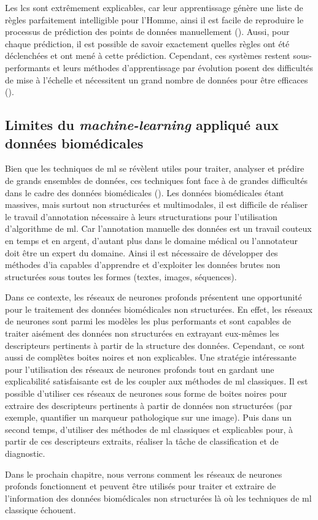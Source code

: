Les \gls{lcs} sont extrêmement explicables, car leur apprentissage génère une liste de règles parfaitement intelligible pour l'Homme, ainsi il est facile de reproduire le processus de prédiction des points de données manuellement (\cite{arrieta_explainable_2019}). Aussi, pour chaque prédiction, il est possible de savoir exactement quelles règles ont été déclenchées et ont mené à cette prédiction. Cependant, ces systèmes restent sous-performants et leurs méthodes d'apprentissage par évolution posent des difficultés de mise à l'échelle et nécessitent un grand nombre de données pour être efficaces (\cite{urbanowicz_exstracs_2015}).

\subsection{Limites du \textit{machine-learning} appliqué aux données biomédicales}
Bien que les techniques de \gls{ml} se révèlent utiles pour traiter, analyser et prédire de grands ensembles de données, ces techniques font face à de grandes difficultés dans le cadre des données biomédicales (\cite{martinez-garcia_data_2022}). Les données biomédicales étant massives, mais surtout non structurées et multimodales, il est difficile de réaliser le travail d'annotation nécessaire à leurs structurations pour l'utilisation d'algorithme de \gls{ml}. Car l'annotation manuelle des données est un travail couteux en temps et en argent, d'autant plus dans le domaine médical ou l'annotateur doit être un expert du domaine. Ainsi il est nécessaire de développer des méthodes d'\gls{ia} capables d'apprendre et d'exploiter les données brutes non structurées sous toutes les formes (textes, images, séquences).

Dans ce contexte, les réseaux de neurones profonds présentent une opportunité pour le traitement des données biomédicales non structurées. En effet, les réseaux de neurones sont parmi les modèles les plus performants et sont capables de traiter aisément des données non structurées en extrayant eux-mêmes les descripteurs pertinents à partir de la structure des données. Cependant, ce sont aussi de complètes boites noires et non explicables. Une stratégie intéressante pour l'utilisation des réseaux de neurones profonds tout en gardant une explicabilité satisfaisante est de les coupler aux méthodes de \gls{ml} classiques. Il est possible d'utiliser ces réseaux de neurones sous forme de boites noires pour extraire des descripteurs pertinents à partir de données non structurées (par exemple, quantifier un marqueur pathologique sur une image). Puis dans un second temps, d'utiliser des méthodes de \gls{ml} classiques et explicables pour, à partir de ces descripteurs extraits, réaliser la tâche de classification et de diagnostic.

Dans le prochain chapitre, nous verrons comment les réseaux de neurones profonds fonctionnent et peuvent être utilisés pour traiter et extraire de l'information des données biomédicales non structurées là où les techniques de \gls{ml} classique échouent.